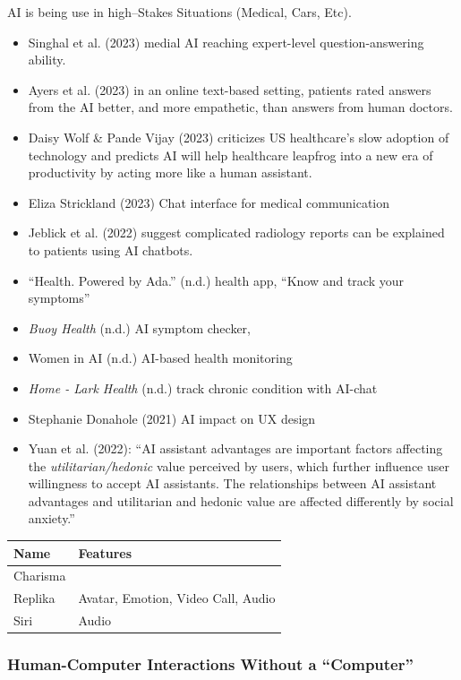 \documentclass[
  letterpaper,
  DIV=11,
  numbers=noendperiod]{scrartcl}
\begin{document}
AI is being use in high--Stakes Situations (Medical, Cars, Etc).

\begin{itemize}
\item
  Singhal et al. (2023) medial AI reaching expert-level
  question-answering ability.
\item
  Ayers et al. (2023) in an online text-based setting, patients rated
  answers from the AI better, and more empathetic, than answers from
  human doctors.
\item
  Daisy Wolf \& Pande Vijay (2023) criticizes US healthcare's slow
  adoption of technology and predicts AI will help healthcare leapfrog
  into a new era of productivity by acting more like a human assistant.
\item
  Eliza Strickland (2023) Chat interface for medical communication
\item
  Jeblick et al. (2022) suggest complicated radiology reports can be
  explained to patients using AI chatbots.
\item
  {``Health. {Powered} by {Ada}.''} (n.d.) health app, ``Know and track
  your symptoms''
\item
  \emph{Buoy {Health}} (n.d.) AI symptom checker,
\item
  Women in AI (n.d.) AI-based health monitoring
\item
  \emph{Home - {Lark Health}} (n.d.) track chronic condition with
  AI-chat
\item
  Stephanie Donahole (2021) AI impact on UX design
\item
  Yuan et al. (2022): ``AI assistant advantages are important factors
  affecting the \emph{utilitarian/hedonic} value perceived by users,
  which further influence user willingness to accept AI assistants. The
  relationships between AI assistant advantages and utilitarian and
  hedonic value are affected differently by social anxiety.''
\end{itemize}

\begin{longtable}[]{@{}ll@{}}
\toprule\noalign{}
Name & Features \\
\midrule\noalign{}
\endhead
\bottomrule\noalign{}
\endlastfoot
Charisma & \\
Replika & Avatar, Emotion, Video Call, Audio \\
Siri & Audio \\
\end{longtable}

\subsubsection{Human-Computer Interactions Without a
``Computer''}\label{human-computer-interactions-without-a-computer}
\end{document}
